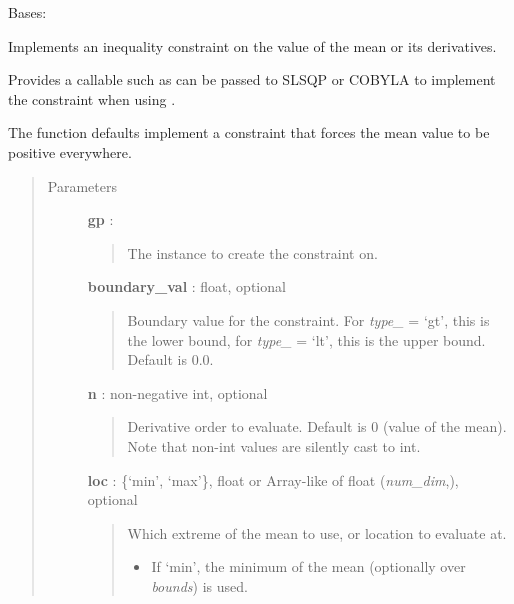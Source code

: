 \documentclass[letterpaper,10pt,english]{sphinxmanual}
\begin{document}

\begin{fulllineitems}
\label{gptools:gptools.gaussian_process.Constraint}
Bases: 

Implements an inequality constraint on the value of the mean or its derivatives.

Provides a callable such as can be passed to SLSQP or COBYLA to implement
the constraint when using .

The function defaults implement a constraint that forces the mean value to
be positive everywhere.
\begin{quote}\begin{description}
\item[{Parameters}] \leavevmode
\textbf{gp} : {\hyperref[gptools:gptools.gaussian_process.GaussianProcess]{}}
\begin{quote}

The {\hyperref[gptools:gptools.gaussian_process.GaussianProcess]{}} instance to create the constraint on.
\end{quote}

\textbf{boundary\_val} : float, optional
\begin{quote}

Boundary value for the constraint. For \emph{type\_} = `gt', this is the lower
bound, for \emph{type\_} = `lt', this is the upper bound. Default is 0.0.
\end{quote}

\textbf{n} : non-negative int, optional
\begin{quote}

Derivative order to evaluate. Default is 0 (value of the mean). Note
that non-int values are silently cast to int.
\end{quote}

\textbf{loc} : \{`min', `max'\}, float or Array-like of float (\emph{num\_dim},), optional
\begin{quote}

Which extreme of the mean to use, or location to evaluate at.
\begin{itemize}
\item {} 
If `min', the minimum of the mean (optionally over \emph{bounds}) is used.


\end{itemize}
\end{quote}
\end{description}
\end{quote}
\end{fulllineitems}
\end{document}
